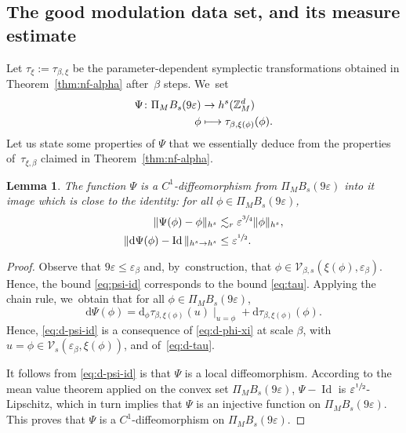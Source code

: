 \documentclass[JEP,XML,SOM,Unicode,published]{cedram}
\newcommand\mto{\mathchoice{\longmapsto}{\mapsto}{\mapsto}{\mapsto}}
\theoremstyle{plain}
\newtheorem{lemma}[theorem]{Lemma}
\theoremstyle{definition}
\DeclareMathOperator{\Id}{Id}
\newcommand{\Z}{\mathbb{Z}}
\newcommand{\1}{\mathbf{1}}
\let\epsilon\varepsilon
\begin{document}
\subsection{The good modulation data set, and its measure estimate}
\label{sec:meas}
Let $\tau_{\xi}:=\tau_{\beta,\xi}$ be the parameter-dependent symplectic transformations obtained in Theorem~\ref{thm:nf-alpha} after~$\beta$ steps. We~set
\begin{equation}
\label{eq:psi}
\begin{aligned}
\Psi \colon \Pi_{M}B_s(9\epsilon) &\to  h^s(\Z_{M}^{d}) \\
\phi& \mto \tau_{\beta,\xi(\phi)}(\phi).
\end{aligned}
\end{equation}
Let us state some properties of $\Psi$ that we essentially deduce from the properties of~$\tau_{\xi,\beta}$ claimed in Theorem~\ref{thm:nf-alpha}.
\begin{lemma}
\label{lem:psi-lip}
The function $\Psi$ is a $C^{1}$-diffeomorphism from $\Pi_{M}B_{s}(9\epsilon)$ into it image which is close to the identity: for all $\phi\in \Pi_{M}B_{s}(9\epsilon)$,
\begin{align}
\label{eq:psi-id}
\|\Psi(\phi)-\phi\|_{h^{s}}
&\lesssim_{r}\epsilon^{\sfrac{3}{4}}\|\phi\|_{h^{s}},\\
\label{eq:d-psi-id}
\|\mathrm{d} \Psi(\phi) -\Id\|_{h^s\to h^s}
&\leq \epsilon^{\sfrac{1}{2}}.
\end{align}
\end{lemma}
\begin{proof}
Observe that $9\epsilon\leq \epsilon_{\beta}$ and, by~construction, that $\phi\in\mathcal{V}_{\beta,s}(\xi(\phi),\epsilon_{\beta})$. Hence, the bound \eqref{eq:psi-id} corresponds to the bound \eqref{eq:tau}. Applying the chain rule, we~obtain that for all $\phi\in \Pi_{M}B_{s}(9\epsilon)$,
\[
\mathrm{d}\Psi(\phi) = \mathrm{d}_{\phi}\tau_{\beta,\xi(\phi)}(u)\mid_{u=\phi}+\mathrm{d}\tau_{\beta,\xi(\phi)}(\phi).
\]
Hence, \eqref{eq:d-psi-id} is a consequence of \eqref{eq:d-phi-xi} at scale $\beta$, with $u=\phi\in\mathcal{V}_{s}(\epsilon_{\beta},\xi(\phi))$, and of~\eqref{eq:d-tau}.

It follows from \eqref{eq:d-psi-id} is that $\Psi$ is a local diffeomorphism. According to the mean value theorem applied on the convex set $\Pi_{M}B_{s}(9\epsilon)$,
$\Psi-\Id$ is $\epsilon^{\sfrac{1}{2}}$-Lipschitz, which in turn implies that $\Psi$ is an injective function on $\Pi_{M}B_{s}(9\epsilon)$. This proves that $\Psi$ is a $C^{1}$-diffeomorphism on $\Pi_{M}B_{s}(9\epsilon)$.
\end{proof}
\end{document}
